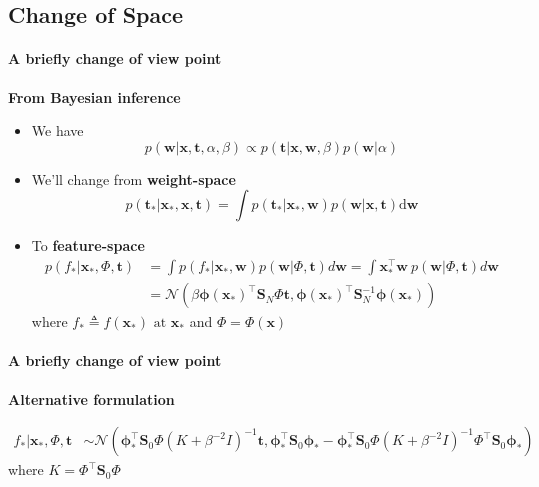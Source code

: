 \subsection{Change of Space}
\begin{frame}{\insertsubsection}
    \framesubtitle{A briefly change of view point} 

    \textcolor{UniGold}{\textbf{From Bayesian inference}}
    \begin{itemize}
        \item We have $$p(\mathbf{w} | \mathbf{x}, \mathbf{t}, \alpha, \beta) \propto p(\mathbf{t} | \mathbf{x}, \mathbf{w}, \beta) p(\mathbf{w} | \alpha)$$
        \item We'll change from \textcolor{UniOrange}{\textbf{weight-space}} $$p(\mathbf{t}_{*} | \mathbf{x}_{*}, \mathbf{x}, \mathbf{t})=\displaystyle\int p(\mathbf{t}_{*} | \mathbf{x}_{*}, \mathbf{w}) p(\mathbf{w} | \mathbf{x}, \mathbf{t}) \mathrm{d} \mathbf{w}$$
        \item To \textcolor{UniOrange}{\textbf{feature-space}}
    \begin{equation*}
       \begin{aligned} p\left(f_{*} | \mathbf{x}_{*}, \Phi, \mathbf{t}\right) &=\int p\left(f_{*} | \mathbf{x}_{*}, \mathbf{w}\right) p(\mathbf{w} | \Phi, \mathbf{t}) d \mathbf{w}=\int \mathbf{x}_{*}^{\top} \mathbf{w} \ p(\mathbf{w} | \Phi, \mathbf{t}) d \mathbf{w} \\ &=\mathcal{N}\left(\beta \boldsymbol{\phi}(\mathbf{x}_{*})^{\top} \mathbf{S}_N \Phi \mathbf{t}, \boldsymbol{\phi}(\mathbf{x}_{*})^{\top} \mathbf{S}_N^{-1} \boldsymbol{\phi}(\mathbf{x}_{*})\right) \end{aligned} 
    \end{equation*}
    where $f_{*} \triangleq f\left(\mathbf{x}_{*}\right) \text { at } \mathbf{x}_{*}$ and $\Phi = \Phi(\mathbf{x})$
    \end{itemize}
\end{frame}

\begin{frame}{\insertsubsection}
    \framesubtitle{A briefly change of view point} 

    \textcolor{UniGold}{\textbf{Alternative formulation}}
    
    \begin{equation*}
        \begin{aligned} f_{*} | \mathbf{x}_{*}, \Phi, \mathbf{t} & \sim \mathcal{N}\left(\boldsymbol{\phi}_{*}^{\top} \mathbf{S}_0 \Phi\left(K+\beta^{-2} I\right)^{-1} \mathbf{t}, \boldsymbol{\phi}_{*}^{\top} \mathbf{S}_0 \boldsymbol{\phi}_{*}-\boldsymbol{\phi}_{*}^{\top} \mathbf{S}_0 \Phi\left(K+\beta^{-2} I\right)^{-1} \Phi^{\top} \mathbf{S}_0 \boldsymbol{\phi}_{*}\right)
        \end{aligned}
    \end{equation*}
    where $K = \Phi^{\top}\mathbf{S}_0\Phi$
    
\end{frame}


